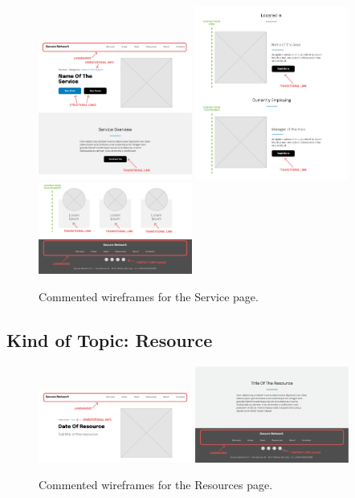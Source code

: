 \documentclass[12pt]{report}
\begin{document}
\begin{figure}[H]
	\centering
	\includegraphics[width=0.45\textwidth]{low_fid_wireframes/service/1.png}
	\includegraphics[width=0.45\textwidth]{low_fid_wireframes/service/2.png}
	\includegraphics[width=0.45\textwidth]{low_fid_wireframes/service/3.png}
	\caption{Commented wireframes for the Service page.}
\end{figure}

\subsection{Kind of Topic: Resource}

\begin{figure}[H]
	\centering
	\includegraphics[width=0.45\textwidth]{low_fid_wireframes/resource/1.png}
	\includegraphics[width=0.45\textwidth]{low_fid_wireframes/resource/2.png}
	\caption{Commented wireframes for the Resources page.}
\end{figure}
\end{document}
